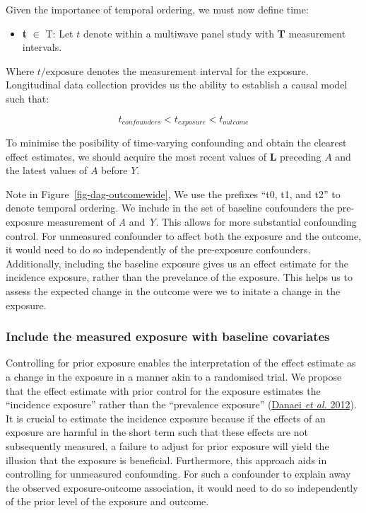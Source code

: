 \documentclass[
  singlecolumn]{article}
\providecommand{\tightlist}{%
  \setlength{\itemsep}{0pt}\setlength{\parskip}{0pt}}\usepackage{longtable,booktabs,array}
\begin{document}
Given the importance of temporal ordering, we must now define time:

\begin{itemize}
\tightlist
\item
  \textbf{t} \(\in\) T: Let \(t\) denote within a multiwave panel study
  with \textbf{T} measurement intervals.
\end{itemize}

Where \(t/\text{{exposure}}\) denotes the measurement interval for the
exposure. Longitudinal data collection provides us the ability to
establish a causal model such that:

\[t_{confounders} < t_{exposure}< t_{outcome}\]

To minimise the posibility of time-varying confounding and obtain the
clearest effect estimates, we should acquire the most recent values of
\(\mathbf{L}\) preceding \(A\) and the latest values of \(A\) before
\(Y\).

Note in Figure~\ref{fig-dag-outcomewide}, We use the prefixes ``t0, t1,
and t2'' to denote temporal ordering. We include in the set of baseline
confounders the pre-exposure measurement of \emph{A} and \emph{Y}. This
allows for more substantial confounding control. For unmeasured
confounder to affect both the exposure and the outcome, it would need to
do so independently of the pre-exposure confounders. Additionally,
including the baseline exposure gives us an effect estimate for the
incidence exposure, rather than the prevelance of the exposure. This
helps us to assess the expected change in the outcome were we to initate
a change in the exposure.

\subsubsection{Include the measured exposure with baseline
covariates}\label{include-the-measured-exposure-with-baseline-covariates}

Controlling for prior exposure enables the interpretation of the effect
estimate as a change in the exposure in a manner akin to a randomised
trial. We propose that the effect estimate with prior control for the
exposure estimates the ``incidence exposure'' rather than the
``prevalence exposure'' (\hyperref[ref-danaei2012]{Danaei \emph{et al.}
2012}). It is crucial to estimate the incidence exposure because if the
effects of an exposure are harmful in the short term such that these
effects are not subsequently measured, a failure to adjust for prior
exposure will yield the illusion that the exposure is beneficial.
Furthermore, this approach aids in controlling for unmeasured
confounding. For such a confounder to explain away the observed
exposure-outcome association, it would need to do so independently of
the prior level of the exposure and outcome.
\end{document}
